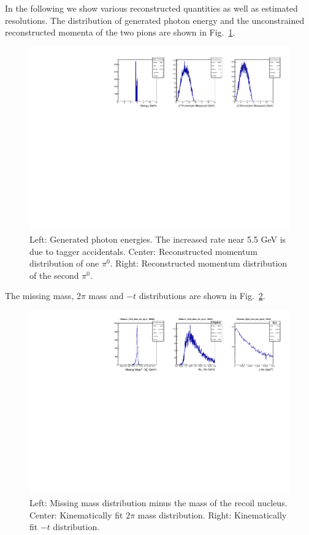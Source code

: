 In the following we show various reconstructed quantities as well as
estimated resolutions. The distribution of generated photon energy and
the unconstrained reconstructed momenta of the two pions are shown in
Fig.~\ref{fig:EgP1P2_signal_DSelector}.
\begin{figure}[tph]
\centering
\includegraphics[width=6in]{figures/EgP1P2_signal_DSelector.pdf}
\caption{Left: Generated photon energies. The increased rate near 5.5 GeV is due to tagger accidentals. Center: Reconstructed momentum distribution of one $\pi^0$. Right: Reconstructed momentum distribution of the second $\pi^0$.
\label{fig:EgP1P2_signal_DSelector}}
\end{figure}
The missing mass, 2$\pi$ mass and $-t$ distributions are shown in Fig.~\ref{fig:MMMpipit_signal_DSelector}.
\begin{figure}[tph]
\centering
\includegraphics[width=6in]{figures/MMMpipit_signal_DSelector.pdf}
\caption{Left: Missing mass distribution minus the mass of the recoil nucleus. Center: Kinematically fit $2\pi$ mass distribution. Right: Kinematically fit $-t$ distribution.
\label{fig:MMMpipit_signal_DSelector}}
\end{figure}
